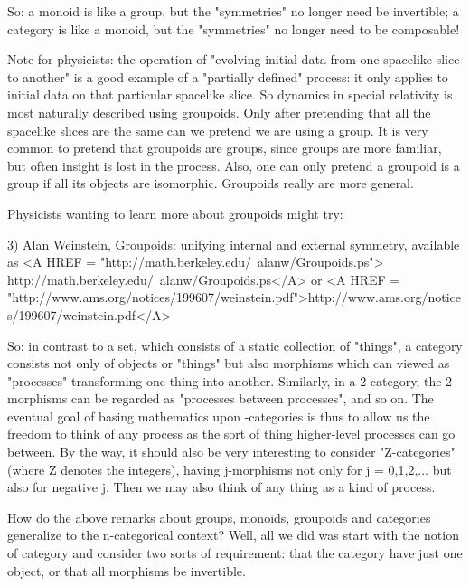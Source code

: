 So: a monoid is like a group, but the "symmetries" no longer
need be invertible; a category is like a monoid, but the
"symmetries" no longer need to be composable!

Note for physicists: the operation of "evolving initial data from
one spacelike slice to another" is a good example of a
"partially defined" process: it only applies to initial data
on that particular spacelike slice.  So dynamics in special relativity
is most naturally described using groupoids.  Only after pretending that
all the spacelike slices are the same can we pretend we are using a
group.  It is very common to pretend that groupoids are groups, since
groups are more familiar, but often insight is lost in the process.
Also, one can only pretend a groupoid is a group if all its objects are
isomorphic.  Groupoids really are more general.

Physicists wanting to learn more about groupoids might try:

3) Alan Weinstein, Groupoids: unifying internal and external symmetry,
available as <A HREF = "http://math.berkeley.edu/~alanw/Groupoids.ps">
http://math.berkeley.edu/~alanw/Groupoids.ps</A> or
<A HREF = "http://www.ams.org/notices/199607/weinstein.pdf">http://www.ams.org/notices/199607/weinstein.pdf</A>

So: in contrast to a set, which consists of a static collection of
"things", a category consists not only of objects or
"things" but also morphisms which can viewed as
"processes" transforming one thing into another.  Similarly,
in a 2-category, the 2-morphisms can be regarded as "processes
between processes", and so on.  The eventual goal of basing
mathematics upon \omega -categories is thus to allow us the freedom to
think of any process as the sort of thing higher-level processes can go
between.  By the way, it should also be very interesting to consider
"Z-categories" (where Z denotes the integers), having
j-morphisms not only for j = 0,1,2,... but also for negative j.  Then we
may also think of any thing as a kind of process.

How do the above remarks about groups, monoids, groupoids and categories
generalize to the n-categorical context?  Well, all we did was start
with the notion of category and consider two sorts of requirement: that
the category have just one object, or that all morphisms be invertible.

